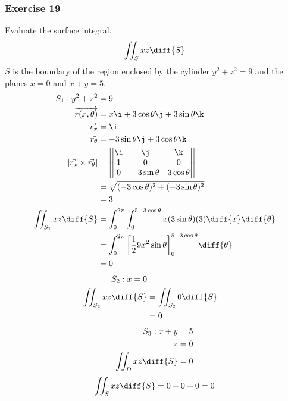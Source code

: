 \documentclass{math}
\begin{document}
\subsubsection*{Exercise 19}
Evaluate the surface integral.
\[ \iint_{S}xz\diff{S} \]
\( S \) is the boundary of the region enclosed by the cylinder \( y^2+z^2 = 9 \)
and the planes \( x = 0 \) and \( x+y = 5 \).
\begin{align*}
  S_1: y^2+z^2 &= 9 \\
  \overrightarrow{r(x,\theta)} &= x\i+3\cos\theta\j+3\sin\theta\k \\
  \vec{r_x} &= \i \\
  \vec{r_\theta} &= -3\sin\theta\j+3\cos\theta\k \\
  |\vec{r_x}\times\vec{r_\theta}| &= \left|\begin{vmatrix}
    \i & \j & \k \\
    1 & 0 & 0 \\
    0 & -3\sin\theta & 3\cos\theta
  \end{vmatrix}\right| \\
  &= \sqrt{(-3\cos\theta)^2+(-3\sin\theta)^2} \\
  &= 3 \\
  \iint_{S_1}xz\diff{S} &= \int_{0}^{2\pi}\int_{0}^{5-3\cos\theta}
    x(3\sin\theta)(3)\diff{x}\diff{\theta} \\
  &= \int_{0}^{2\pi}\bigg[\frac{1}{2}9x^2\sin\theta\bigg]_{0}^{5-3\cos\theta}
    \diff{\theta} \\
  &= 0
\end{align*}
\begin{align*}
  S_2: x = 0 \\
  \iint_{S_2}xz\diff{S} &= \iint_{S_2}0\diff{S} \\
  &= 0
\end{align*}
\begin{align*}
  S_3: x+y &= 5 \\
  z &= 0 \\
  \iint_{D}xz\diff{S} &= 0
\end{align*}
\[ \iint_{S}xz\diff{S} = 0+0+0 = 0 \]
\end{document}
